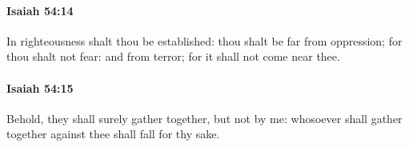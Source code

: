 		\paragraph{Isaiah 54:14} %
			\label{ISAIAH-54-14}

			In righteousness shalt thou be established: thou shalt be far from oppression; for thou shalt not fear: and from terror; for it shall not come near thee.


		\paragraph{Isaiah 54:15} %
			\label{ISAIAH-54-15}

			Behold, they shall surely gather together, but not by me: whosoever shall gather together against thee shall fall for thy sake.


